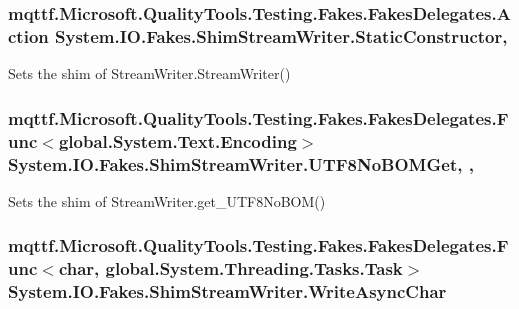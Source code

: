 \hypertarget{class_system_1_1_i_o_1_1_fakes_1_1_shim_stream_writer_a306f17a147cdfad0c292e3c6cf1b470f}{
\subsubsection[{Static\-Constructor}]{\setlength{\rightskip}{0pt plus 5cm}mqttf.\-Microsoft.\-Quality\-Tools.\-Testing.\-Fakes.\-Fakes\-Delegates.\-Action System.\-I\-O.\-Fakes.\-Shim\-Stream\-Writer.\-Static\-Constructor\hspace{0.3cm}{\ttfamily [static]}, {\ttfamily [set]}}}\label{class_system_1_1_i_o_1_1_fakes_1_1_shim_stream_writer_a306f17a147cdfad0c292e3c6cf1b470f}


Sets the shim of Stream\-Writer.\-Stream\-Writer()

\hypertarget{class_system_1_1_i_o_1_1_fakes_1_1_shim_stream_writer_a60aee5d612752d20cf3307f7cf96613a}{
\subsubsection[{U\-T\-F8\-No\-B\-O\-M\-Get}]{\setlength{\rightskip}{0pt plus 5cm}mqttf.\-Microsoft.\-Quality\-Tools.\-Testing.\-Fakes.\-Fakes\-Delegates.\-Func$<$global.\-System.\-Text.\-Encoding$>$ System.\-I\-O.\-Fakes.\-Shim\-Stream\-Writer.\-U\-T\-F8\-No\-B\-O\-M\-Get\hspace{0.3cm}{\ttfamily [static]}, {\ttfamily [get]}, {\ttfamily [set]}}}\label{class_system_1_1_i_o_1_1_fakes_1_1_shim_stream_writer_a60aee5d612752d20cf3307f7cf96613a}


Sets the shim of Stream\-Writer.\-get\-\_\-\-U\-T\-F8\-No\-B\-O\-M()

\hypertarget{class_system_1_1_i_o_1_1_fakes_1_1_shim_stream_writer_af3395871c3dd37e7a5b32ad12d21db79}{
\subsubsection[{Write\-Async\-Char}]{\setlength{\rightskip}{0pt plus 5cm}mqttf.\-Microsoft.\-Quality\-Tools.\-Testing.\-Fakes.\-Fakes\-Delegates.\-Func$<$char, global.\-System.\-Threading.\-Tasks.\-Task$>$ System.\-I\-O.\-Fakes.\-Shim\-Stream\-Writer.\-Write\-Async\-Char\hspace{0.3cm}{\ttfamily [set]}}}\label{class_system_1_1_i_o_1_1_fakes_1_1_shim_stream_writer_af3395871c3dd37e7a5b32ad12d21db79}


